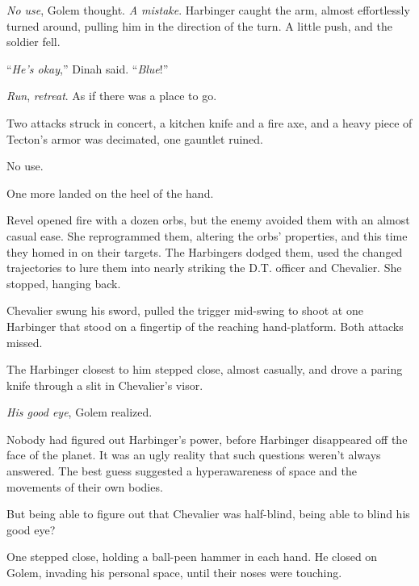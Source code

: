 \emph{No use}, Golem thought.  \emph{A mistake}.  Harbinger caught the arm, almost effortlessly turned around, pulling him in the direction of the turn.  A little push, and the soldier fell.



``\emph{He's okay},'' Dinah said.  ``\emph{Blue}!''



\emph{Run}, \emph{retreat}.  As if there was a place to go.



Two attacks struck in concert, a kitchen knife and a fire axe, and a heavy piece of Tecton's armor was decimated, one gauntlet ruined.



No use.



One more landed on the heel of the hand.



Revel opened fire with a dozen orbs, but the enemy avoided them with an almost casual ease.  She reprogrammed them, altering the orbs' properties, and this time they homed in on their targets.  The Harbingers dodged them, used the changed trajectories to lure them into nearly striking the D.T. officer and Chevalier.  She stopped, hanging back.



Chevalier swung his sword, pulled the trigger mid-swing to shoot at one Harbinger that stood on a fingertip of the reaching hand-platform.  Both attacks missed.



The Harbinger closest to him stepped close, almost casually, and drove a paring knife through a slit in Chevalier's visor.



\emph{His good eye}, Golem realized.



Nobody had figured out Harbinger's power, before Harbinger disappeared off the face of the planet.  It was an ugly reality that such questions weren't always answered.  The best guess suggested a hyperawareness of space and the movements of their own bodies.



But being able to figure out that Chevalier was half-blind, being able to blind his good eye?



One stepped close, holding a ball-peen hammer in each hand.  He closed on Golem, invading his personal space, until their noses were touching.



